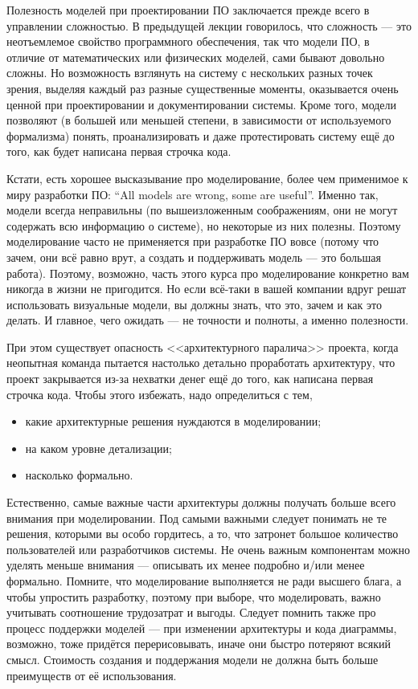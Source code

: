 \documentclass[a5paper]{article}
\begin{document}
Полезность моделей при проектировании ПО заключается прежде всего в управлении сложностью. В предыдущей лекции говорилось, что сложность --- это неотъемлемое свойство программного обеспечения, так что модели ПО, в отличие от математических или физических моделей, сами бывают довольно сложны. Но возможность взглянуть на систему с нескольких разных точек зрения, выделяя каждый раз разные существенные моменты, оказывается очень ценной при проектировании и документировании системы. Кроме того, модели позволяют (в большей или меньшей степени, в зависимости от используемого формализма) понять, проанализировать и даже протестировать систему ещё до того, как будет написана первая строчка кода.

Кстати, есть хорошее высказывание про моделирование, более чем применимое к миру разработки ПО: ``All models are wrong, some are useful''. Именно так, модели всегда неправильны (по вышеизложенным соображениям, они не могут содержать всю информацию о системе), но некоторые из них полезны. Поэтому моделирование часто не применяется при разработке ПО вовсе (потому что зачем, они всё равно врут, а создать и поддерживать модель --- это большая работа). Поэтому, возможно, часть этого курса про моделирование конкретно вам никогда в жизни не пригодится. Но если всё-таки в вашей компании вдруг решат использовать визуальные модели, вы должны знать, что это, зачем и как это делать. И главное, чего ожидать --- не точности и полноты, а именно полезности.

При этом существует опасность <<архитектурного паралича>> проекта, когда неопытная команда пытается настолько детально проработать архитектуру, что проект закрывается из-за нехватки денег ещё до того, как написана первая строчка кода. Чтобы этого избежать, надо определиться с тем,

\begin{itemize}
	\item какие архитектурные решения нуждаются в моделировании;
	\item на каком уровне детализации;
	\item насколько формально.
\end{itemize}

Естественно, самые важные части архитектуры должны получать больше всего внимания при моделировании. Под самыми важными следует понимать не те решения, которыми вы особо гордитесь, а то, что затронет большое количество пользователей или разработчиков системы. Не очень важным компонентам можно уделять меньше внимания --- описывать их менее подробно и/или менее формально. Помните, что моделирование выполняется не ради высшего блага, а чтобы упростить разработку, поэтому при выборе, что моделировать, важно учитывать соотношение трудозатрат и выгоды. Следует помнить также про процесс поддержки моделей --- при изменении архитектуры и кода диаграммы, возможно, тоже придётся перерисовывать, иначе они быстро потеряют всякий смысл. Стоимость создания и поддержания модели не должна быть больше преимуществ от её использования.
\end{document}
